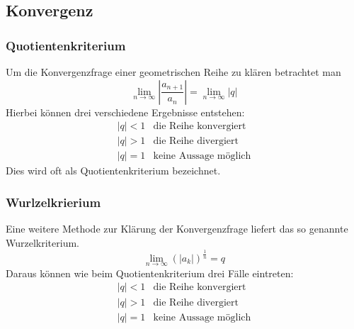 \subsection{Konvergenz}

\subsubsection*{Quotientenkriterium}
Um die Konvergenzfrage einer geometrischen Reihe zu klären betrachtet man
\[ \lim\limits_{n \rightarrow \infty} \left| \frac{a_{n+1}}{a_n} \right| = \lim\limits_{n \rightarrow \infty} \left| q \right| \]
Hierbei können drei verschiedene Ergebnisse entstehen:
\[ \boxed{\begin{array}{ll}
|q| < 1 & \text{die Reihe konvergiert} \\
|q| > 1 & \text{die Reihe divergiert} \\
|q| = 1 & \text{keine Aussage möglich}
\end{array}} \]
Dies wird oft als Quotientenkriterium bezeichnet.

\subsubsection*{Wurlzelkrierium}
Eine weitere Methode zur Klärung der Konvergenzfrage liefert das so genannte Wurzelkriterium.
\[ \lim\limits_{n \rightarrow \infty} \left( |a_k| \right)^{\frac{1}{n}} = q\]
Daraus können wie beim Quotientenkriterium drei Fälle eintreten:
\[ \boxed{\begin{array}{ll}
|q| < 1 & \text{die Reihe konvergiert} \\
|q| > 1 & \text{die Reihe divergiert} \\
|q| = 1 & \text{keine Aussage möglich} 
\end{array}} \]


\ifti
